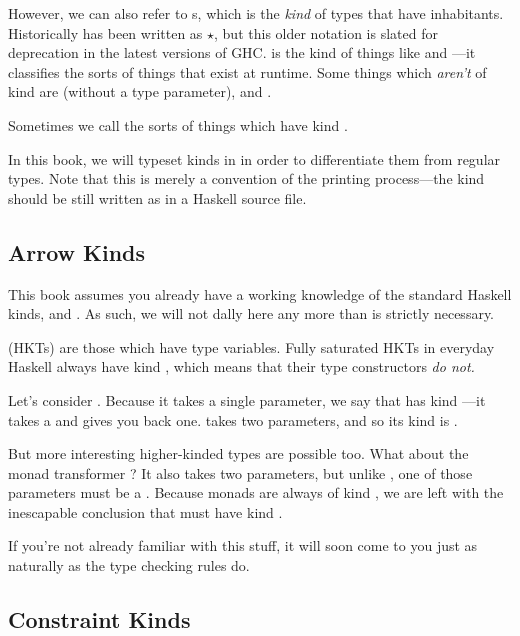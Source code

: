 \documentclass[book.tex]{subfiles}
\begin{document}
However, we can also refer to s, which is the \emph{kind} of types
that have inhabitants. Historically  has been written as $\star$, but
this older notation is slated for deprecation in the latest versions of GHC.
 is the kind of things like  and ---it
classifies the sorts of things that exist at runtime. Some things which
\emph{aren't} of kind  are  (without a type parameter), and
.

Sometimes we call the sorts of things which have kind  .

In this book, we will typeset kinds in  in order to
differentiate them from regular types. Note that this is merely a convention of
the printing process---the kind  should be still written as 
in a Haskell source file.


\subsection{Arrow Kinds}

This book assumes you already have a working knowledge of the standard Haskell
kinds,  and \kind{(->)}. As such, we will not dally here any more
than is strictly necessary.

 (HKTs) are those which have type
variables. Fully saturated HKTs in everyday Haskell always have kind
, which means that their type constructors \emph{do not.}

Let's consider . Because it takes a single  parameter, we
say that  has kind ---it takes a  and
gives you back one.  takes two parameters, and so its kind is
.

But more interesting higher-kinded types are possible too. What about the monad
transformer ? It also takes two parameters, but unlike ,
one of those parameters must be a . Because monads are always of kind
, we are left with the inescapable conclusion that
 must have kind .

If you're not already familiar with this stuff, it will soon come to you just as
naturally as the type checking rules do.


\subsection{Constraint Kinds}
\end{document}
